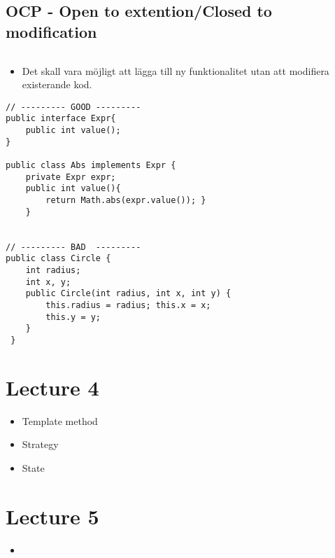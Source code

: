 \documentclass[11pt]{amsart}
\begin{document}
\subsection{OCP - Open to extention/Closed to modification}
$ $
\begin{itemize}
  \item Det skall vara möjligt att lägga till ny funktionalitet utan att
  modifiera existerande kod.
\end{itemize}
\begin{lstlisting}
// --------- GOOD ---------
public interface Expr{
	public int value();
}

public class Abs implements Expr { 
	private Expr expr;
	public int value(){
  		return Math.abs(expr.value()); }
	}


// --------- BAD  ---------
public class Circle { 
	int radius;
	int x, y;
	public Circle(int radius, int x, int y) {
		this.radius = radius; this.x = x;
		this.y = y;
	}
 }
\end{lstlisting}

\section{Lecture 4}

\begin{itemize}
\item Template method
\item Strategy
\item State
\end{itemize}

\section{Lecture 5}
\begin{itemize}
  \item 
\end{itemize}
\end{document}
